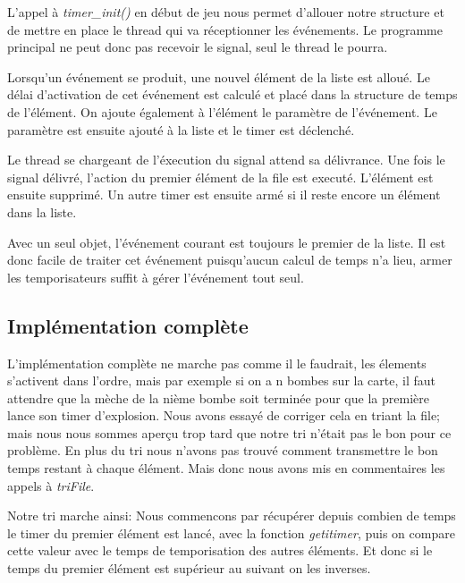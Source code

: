 \documentclass[10pt,a4paper]{article}
\begin{document}
	L'appel à \textit{timer\_init()} en début de jeu nous permet d'allouer notre structure et de mettre en place le thread qui va réceptionner les événements. Le programme principal ne peut donc pas recevoir le signal, seul le thread le pourra. 
	
	Lorsqu'un événement se produit, une nouvel élément de la liste est alloué. Le délai d'activation de cet événement est calculé et placé dans la structure de temps de l'élément. On ajoute également à l'élément le paramètre de l'événement. Le paramètre est ensuite ajouté à la liste et le timer est déclenché.
	
	Le thread se chargeant de l'éxecution du signal attend sa délivrance. Une fois le signal délivré, l'action du premier élément de la file est executé. L'élément est ensuite supprimé.  Un autre timer est ensuite armé si il reste encore un élément dans la liste.
	
	Avec un seul objet, l'événement courant est toujours le premier de la liste. Il est donc facile de traiter cet événement puisqu'aucun calcul de temps n'a lieu, armer les temporisateurs suffit à gérer l'événement tout seul.
	
	\subsection{Implémentation complète} 
    L'implémentation complète ne marche pas comme il le faudrait, les élements s'activent dans l'ordre, mais par exemple si on a n bombes sur la carte, il faut attendre que la mèche de la nième bombe soit terminée pour que la première lance son timer d'explosion. Nous avons essayé de corriger cela en triant la file; mais nous nous sommes aperçu trop tard que notre tri n'était pas le bon pour ce problème. En plus du tri nous n'avons pas trouvé comment transmettre le bon temps restant à chaque élément. Mais donc nous avons mis en commentaires les appels à \textit{triFile}.
    
    Notre tri marche ainsi:
    Nous commencons par récupérer depuis combien de temps le timer du premier élément est lancé, avec la fonction \textit{getitimer}, puis on compare cette valeur avec le temps de temporisation des autres éléments. Et donc si le temps du premier élément est supérieur au suivant on les inverses. 
\end{document}
